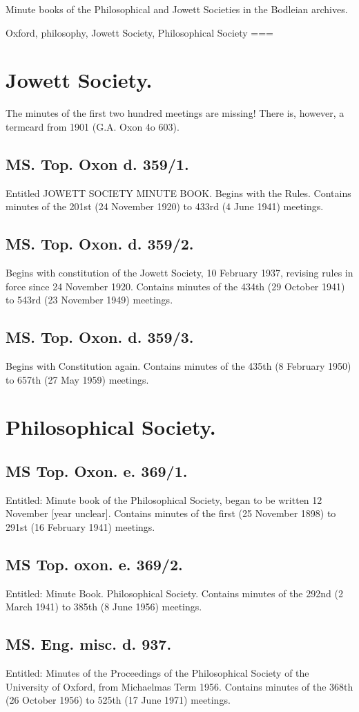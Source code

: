 Minute books of the Philosophical and Jowett Societies in the Bodleian archives.

Oxford, philosophy, Jowett Society, Philosophical Society
===
\section*{Jowett Society.}

The minutes of the first two hundred meetings are missing! There is, however, a termcard from 1901 (G.A. Oxon 4o 603).

\subsection*{MS. Top. Oxon d. 359/1.}
Entitled JOWETT SOCIETY MINUTE BOOK. Begins with the Rules. Contains minutes of the 201st (24 November 1920) to 433rd (4 June 1941) meetings.

\subsection*{MS. Top. Oxon. d. 359/2.}
Begins with constitution of the Jowett Society, 10 February 1937, revising rules in force since 24 November 1920.
Contains minutes of the 434th (29 October 1941) to 543rd (23 November 1949) meetings.

\subsection*{MS. Top. Oxon. d. 359/3.}
Begins with Constitution again. Contains minutes of the 435th (8 February 1950) to 657th (27 May 1959) meetings.

\section*{Philosophical Society.}
\subsection{MS Top. Oxon. e. 369/1.}
Entitled: Minute book of the Philosophical Society, began to be written 12 November [year unclear]. Contains minutes of the first (25 November 1898) to 291st (16 February 1941) meetings.

\subsection*{MS Top. oxon. e. 369/2.}
Entitled: Minute Book. Philosophical Society. Contains minutes of the 292nd (2 March 1941) to 385th (8 June 1956) meetings.

\subsection*{MS. Eng. misc. d. 937.}
Entitled: Minutes of the Proceedings of the Philosophical Society of the University of Oxford, from Michaelmas Term 1956. Contains minutes of the 368th (26 October 1956) to 525th (17 June 1971) meetings.